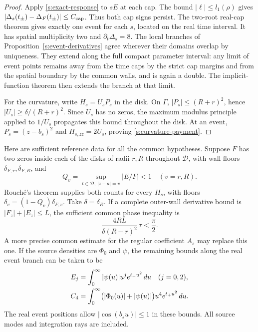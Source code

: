 \begin{proof}
Apply \eqref{s:exact-response} to $sE$ at each cap.  The bound
$|\ell|\le l_1(\rho)$ gives
$|\Delta_s(t_\pm)-\Delta_F(t_\pm)|\le C_{\rm cap}$.
Thus both cap signs persist.  The two-root real-cap theorem gives
exactly one event for each $s$, located on the real time interval.  It
has spatial multiplicity two and $\partial_t\Delta_s=8$.  The local
branches of Proposition~\ref{s:event-derivatives} agree wherever their
domains overlap by uniqueness.  They extend along the full compact
parameter interval: any limit of event points remains away from the
time caps by the strict cap margins and from the spatial boundary by
the common walls, and is again a double.  The implicit-function theorem
then extends the branch at that limit.

For the curvature, write $H_s=U_sP_s$ in the disk.  On $\Gamma$,
$|P_s|\le(R+r)^2$, hence $|U_s|\ge\delta/(R+r)^2$.  Since $U_s$
has no zeros, the maximum modulus principle applied to $1/U_s$
propagates this bound throughout the disk.  At an event,
$P_s=(z-b_s)^2$ and $H_{s,zz}=2U_s$, proving
\eqref{s:curvature-payment}.
\end{proof}

Here are sufficient reference data for all the common hypotheses.
Suppose $F$ has two zeros inside each of the disks of radii $r,R$
throughout $\mathcal D$, with wall floors $\delta_{F,r},\delta_{F,R}$,
and
\[
 Q_v=\sup_{t\in\mathcal D,\ |z-a|=v}|E/F|<1\quad(v=r,R).
\]
Rouch\'e's theorem supplies both counts for every $H_s$, with floors
$\delta_v=(1-Q_v)\delta_{F,v}$.  Take $\delta=\delta_R$.  If a
complete outer-wall derivative bound is $|F_z|+|E_z|\le L$, the
sufficient common phase inequality is
\begin{equation}
 \frac{4RL}{\delta(R-r)^2}\,\tau<\frac\pi2.
 \label{s:common-phase}
\end{equation}
A more precise common estimate for the regular coefficient $A_s$ may
replace this one.  If the source densities are $\Phi_0$ and $\psi$,
the remaining bounds along the real event branch can be taken to be
\begin{align}
 E_j&=\int_0^\infty|\psi(u)|u^je^{t_+u^2}\,du\quad(j=0,2),\notag\\
 C_4&=\int_0^\infty\bigl(|\Phi_0(u)|+|\psi(u)|\bigr)
                           u^4e^{t_+u^2}\,du.
 \label{s:moment-payments}
\end{align}
The real event positions allow $|\cos(b_su)|\le1$ in these bounds.
All source modes and integration rays are included.

